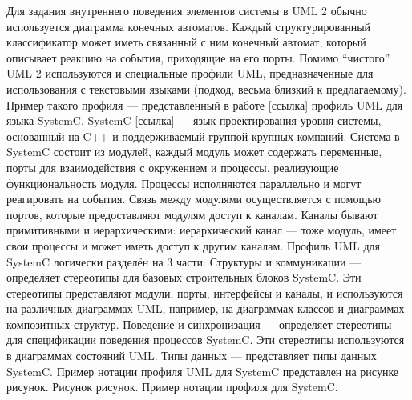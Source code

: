 Для задания внутреннего поведения элементов системы в UML 2  обычно используется диаграмма конечных автоматов. Каждый структурированный классификатор может иметь связанный с ним конечный автомат, который описывает реакцию на события, приходящие на его порты.
Помимо “чистого” UML 2 используются и специальные профили UML, предназначенные для использования с текстовыми языками (подход, весьма близкий к предлагаемому). Пример такого профиля --- представленный в работе [ссылка] профиль UML для языка SystemC. SystemC [ссылка] --- язык проектирования уровня системы, основанный на C++ и поддерживаемый группой крупных компаний. Система в SystemC состоит из модулей, каждый модуль может содержать переменные, порты для взаимодействия с окружением и процессы, реализующие функциональность модуля. Процессы исполняются параллельно и могут реагировать на события. Связь между модулями осуществляется с помощью портов, которые предоставляют модулям доступ к каналам. Каналы бывают примитивными и иерархическими: иерархический канал --- тоже модуль, имеет свои процессы и может иметь доступ к другим каналам.
Профиль UML для SystemC логически разделён на 3 части:
Структуры и коммуникации --- определяет стереотипы для базовых строительных блоков SystemC. Эти стереотипы представляют модули, порты, интерфейсы и каналы, и используются на различных диаграммах UML, например, на диаграммах классов и диаграммах композитных структур.
Поведение и синхронизация --- определяет стереотипы для спецификации поведения процессов SystemC. Эти стереотипы используются в диаграммах состояний UML.
Типы данных --- представляет типы данных SystemC.
	Пример нотации профиля UML для SystemC представлен на рисунке рисунок.
Рисунок рисунок. Пример нотации профиля для SystemC.

